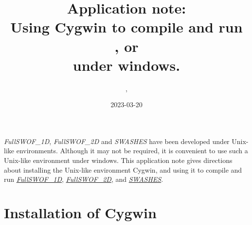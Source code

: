 \documentclass[a4paper, 11pt]{article}
\title{Application note:\\
Using Cygwin to compile and run\\
\FullSWOFoneD, \FullSWOFtwoD{} or \SWASHES{}\\
under windows.}
\author{\contactFullName, \contactEmail}
\date{2023-03-20}
\newcommand{\FullSWOFoneD}{\emph{FullSWOF\_1D}}
\newcommand{\FullSWOFtwoD}{\emph{FullSWOF\_2D}}
\newcommand{\SWASHES}{\emph{SWASHES}}
\newcommand{\MainWebSiteFSoneD}{https://sourcesup.renater.fr/projects/fullswof-1d/}
\newcommand{\MainWebSiteFStwoD}{https://sourcesup.renater.fr/projects/fullswof-2d/}
\newcommand{\MainWebSiteSWASHES}{https://sourcesup.renater.fr/projects/swashes/}
\begin{document}
\maketitle

\thispagestyle{fancy}

\FullSWOFoneD, \FullSWOFtwoD{} and \SWASHES{} have been developed under Unix-like environments. Although it may not be required, it is convenient to use such a Unix-like environment under windows. This application note gives directions about installing the Unix-like environment Cygwin, and using it to compile and run  
\href{\MainWebSiteFSoneD}{\FullSWOFoneD},
\href{\MainWebSiteFStwoD}{\FullSWOFtwoD}, and
\href{\MainWebSiteSWASHES}{\SWASHES}.

\section{Installation of Cygwin}
\end{document}
